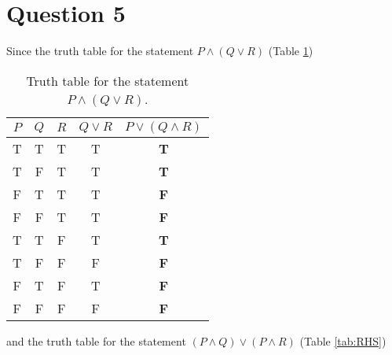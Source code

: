 \documentclass[11pt, oneside]{article}   	%
\begin{document}
\cleardoublepage

\section*{Question 5}

Since the truth table for the statement $P \wedge (Q \vee R)$ (Table \ref{tab:LHS}) 

\begin{table}[h]                                           %
\begin{center}
\begin{tabular}{c c c | c || c}                                %
    $P$ & $Q$ & $R$ & $Q \vee R$ & $P \vee (Q \wedge R)$  \\
    \hline
    T & T & T & T & \textbf{T} \\
    T & F & T & T & \textbf{T} \\
    F & T & T & T & \textbf{F} \\
    F & F & T & T & \textbf{F} \\
    T & T & F & T & \textbf{T} \\
    T & F & F & F & \textbf{F} \\
    F & T & F & T & \textbf{F} \\
    F & F & F & F & \textbf{F} \\       					          
\end{tabular}
\end{center}

\caption{Truth table for the statement $P \wedge (Q \vee R)$.}
\label{tab:LHS} 
\end{table}

and the truth table for the statement $(P \wedge Q) \vee (P \wedge R)$ (Table \ref{tab:RHS}) 
\end{document}
